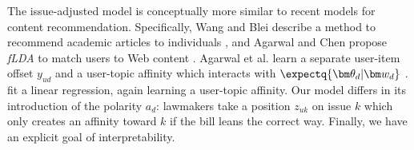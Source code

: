 
The issue-adjusted model is conceptually more similar to recent
models for content recommendation. Specifically, Wang and Blei
describe a method to recommend academic articles to individuals
\citep{wang:2011}, and Agarwal and Chen propose \emph{fLDA} to match
users to Web content \citep{agarwal:2010}. Agarwal et al. learn a
separate user-item offset $y_{ud}$ and a user-topic affinity which
interacts with $\expectq{\bm \theta_d | \bm w_d}$ \citep{agarwal:2010}.
\cite{wang:2011} fit a linear regression, again learning a user-topic
affinity.  Our model differs in its introduction of
the polarity $a_d$: lawmakers take a position $z_{uk}$ on issue $k$
which only creates an affinity toward $k$ if the bill leans the
correct way.  Finally, we have an explicit goal of interpretability.





